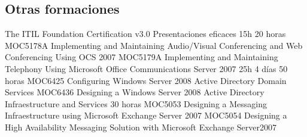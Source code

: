 \documentclass[11pt,a4paper]{moderncv}
\begin{document}
\subsection{Otras formaciones}
 {\scriptsize{
The ITIL Foundation Certification v3.0\newline
Presentaciones eficaces}} %
 {15h}{} %
 {20 horas}{\scriptsize{
MOC5178A Implementing and Maintaining Audio/Visual Conferencing and Web Conferencing Using OCS 2007\newline
MOC5179A Implementing and Maintaining Telephony Using Microsoft Office Communications Server 2007}}
 {25h}{}
 {4 d\'ias}{}
 {50 horas}{\scriptsize{
MOC6425 Configuring Windows Server 2008 Active Directory Domain Services \newline %
MOC6436 Designing a Windows Server 2008 Active Directory Infraestructure and Services}}
 {30 horas}{\scriptsize{
MOC5053 Designing a Messaging Infraestructure using Microsoft Exchange Server 2007\newline
MOC5054 Designing a High Availability Messaging Solution with Microsoft Exchange Server2007}}
\end{document}
